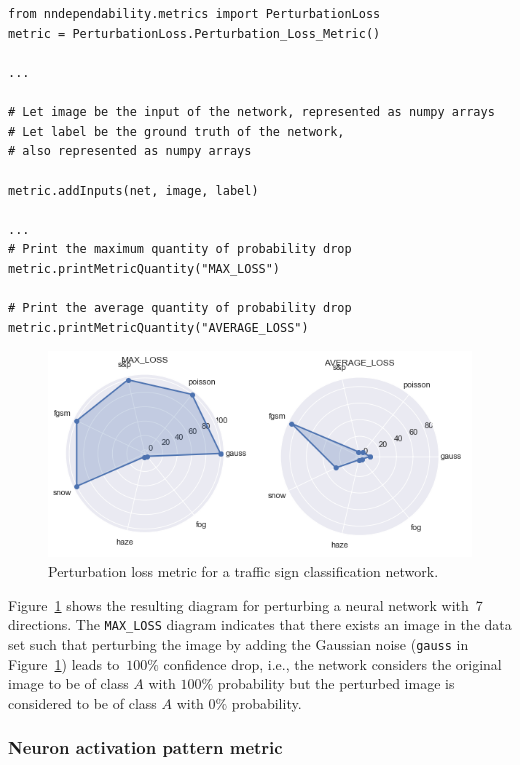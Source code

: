 \documentclass{article}
\begin{document}
\begin{small}
\color{blue}
\begin{verbatim}


from nndependability.metrics import PerturbationLoss
metric = PerturbationLoss.Perturbation_Loss_Metric()

...

# Let image be the input of the network, represented as numpy arrays
# Let label be the ground truth of the network, 
# also represented as numpy arrays

metric.addInputs(net, image, label)

...
# Print the maximum quantity of probability drop
metric.printMetricQuantity("MAX_LOSS")

# Print the average quantity of probability drop
metric.printMetricQuantity("AVERAGE_LOSS")

\end{verbatim}
\end{small}


\begin{figure}[ht]
\centering
\includegraphics[width=12cm]{fig/PerturbationLoss.png}
\caption{Perturbation loss metric for a traffic sign classification network.}
\label{fig.perturbation}
\end{figure}

Figure~\ref{fig.perturbation} shows the resulting diagram for perturbing a neural network with~7 directions. The \texttt{MAX\_LOSS} diagram indicates that there exists an image in the data set such that perturbing the image by adding the Gaussian noise (\texttt{gauss} in Figure~\ref{fig.perturbation}) leads to~$100\%$ confidence drop, i.e., the network considers the original image to be of class $A$ with $100\%$ probability but the perturbed image is considered to be of class $A$ with $0\%$ probability. 


\subsubsection{Neuron activation pattern metric}
\end{document}
